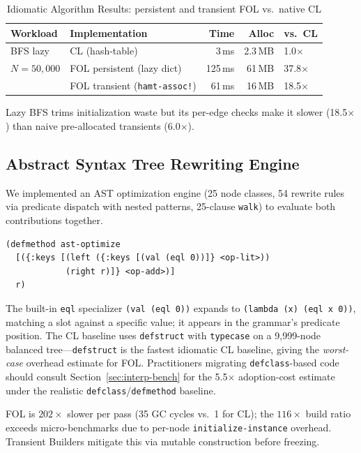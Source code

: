 \documentclass[sigconf,nonacm]{acmart}
\begin{document}
\begin{table}[htbp]
\small
\caption{Idiomatic Algorithm Results: persistent and transient FOL vs.\ native CL}
\label{tab:idiomatic-bench}
\begin{tabular}{llrrl}
\toprule
\textbf{Workload} & \textbf{Implementation} & \textbf{Time} & \textbf{Alloc} & \textbf{vs.\ CL} \\
\midrule
BFS lazy        & CL (hash-table)                 &    3\,ms &   2.3\,MB & 1.0$\times$ \\
$N=50{,}000$    & FOL persistent (lazy dict)      &  125\,ms &  61\,MB   & 37.8$\times$ \\
                & FOL transient (\texttt{hamt-assoc!}) &   61\,ms &  16\,MB   & 18.5$\times$ \\
\bottomrule
\end{tabular}
\end{table}

Lazy BFS trims initialization waste but its per-edge checks make it slower (18.5$\times$) than naive pre-allocated transients (6.0$\times$).

\subsection{Abstract Syntax Tree Rewriting Engine}
\label{sec:ast-bench}

We implemented an AST optimization engine (25 node classes, 54 rewrite rules via predicate dispatch with nested patterns, 25-clause \texttt{walk}) to evaluate both contributions together.

\begin{lstlisting}
(defmethod ast-optimize
  [({:keys [(left ({:keys [(val (eql 0))]} <op-lit>))
            (right r)]} <op-add>)]
  r)
\end{lstlisting}

\noindent The built-in \texttt{eql} specializer \texttt{(val (eql 0))} expands to \texttt{(lambda (x) (eql x 0))}, matching a slot against a specific value; it appears in the grammar's predicate position.
The CL baseline uses \texttt{defstruct} with \texttt{typecase} on a 9{,}999-node balanced tree---\texttt{defstruct} is the fastest idiomatic CL baseline, giving the \emph{worst-case} overhead estimate for FOL.
Practitioners migrating \texttt{defclass}-based code should consult Section~\ref{sec:interp-bench} for the 5.5$\times$ adoption-cost estimate under the realistic \texttt{defclass}/\texttt{defmethod} baseline.

FOL is $202{\times}$ slower per pass (35 GC cycles vs.\ 1 for CL); the $116{\times}$ build ratio exceeds micro-benchmarks due to per-node \texttt{initialize-instance} overhead.
Transient Builders mitigate this via mutable construction before freezing.
\end{document}
